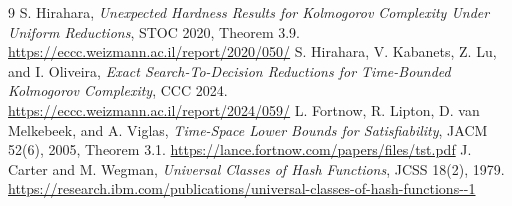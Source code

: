 \documentclass[11pt]{article}
\begin{document}
\begin{thebibliography}{9}
 S. Hirahara, \emph{Unexpected Hardness Results for
Kolmogorov Complexity Under Uniform Reductions}, STOC 2020, Theorem 3.9.
\url{https://eccc.weizmann.ac.il/report/2020/050/}
 S. Hirahara, V. Kabanets, Z. Lu, and I. Oliveira,
\emph{Exact Search-To-Decision Reductions for Time-Bounded Kolmogorov
Complexity}, CCC 2024. \url{https://eccc.weizmann.ac.il/report/2024/059/}
 L. Fortnow, R. Lipton, D. van Melkebeek, and A. Viglas,
\emph{Time-Space Lower Bounds for Satisfiability}, JACM 52(6), 2005,
Theorem 3.1. \url{https://lance.fortnow.com/papers/files/tst.pdf}
 J. Carter and M. Wegman, \emph{Universal Classes of Hash
Functions}, JCSS 18(2), 1979.
\url{https://research.ibm.com/publications/universal-classes-of-hash-functions--1}
\end{thebibliography}
\end{document}
